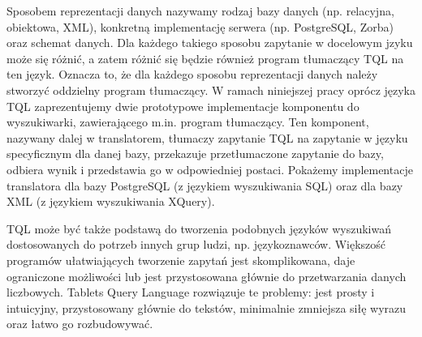 Sposobem reprezentacji danych nazywamy rodzaj bazy danych (np. relacyjna, obiektowa, XML), konkretną implementację serwera (np. PostgreSQL, Zorba) oraz schemat danych. Dla każdego takiego sposobu zapytanie w docelowym jzyku może się różnić, a zatem różnić się będzie również program tłumaczący TQL na ten język.
Oznacza to, że dla każdego sposobu reprezentacji danych należy stworzyć oddzielny program tłumaczący. 
W ramach niniejszej pracy oprócz języka TQL zaprezentujemy dwie prototypowe implementacje komponentu do wyszukiwarki, zawierającego m.in. program tłumaczący.
Ten komponent, nazywany dalej w translatorem, tłumaczy zapytanie TQL na zapytanie w języku specyficznym dla danej bazy, przekazuje przetłumaczone zapytanie do bazy, odbiera wynik i przedstawia go w odpowiedniej postaci. Pokażemy implementacje translatora dla bazy PostgreSQL (z językiem wyszukiwania SQL) oraz dla bazy XML (z językiem wyszukiwania XQuery).





TQL może być także podstawą do tworzenia podobnych języków wyszukiwań dostosowanych do potrzeb innych grup ludzi, np. językoznawców.
Większość programów ułatwiających tworzenie zapytań jest skomplikowana, daje ograniczone możliwości lub jest przystosowana głównie do przetwarzania danych liczbowych. Tablets Query Language rozwiązuje te problemy: jest prosty i intuicyjny, przystosowany głównie do tekstów, minimalnie zmniejsza siłę wyrazu oraz łatwo go rozbudowywać. 




